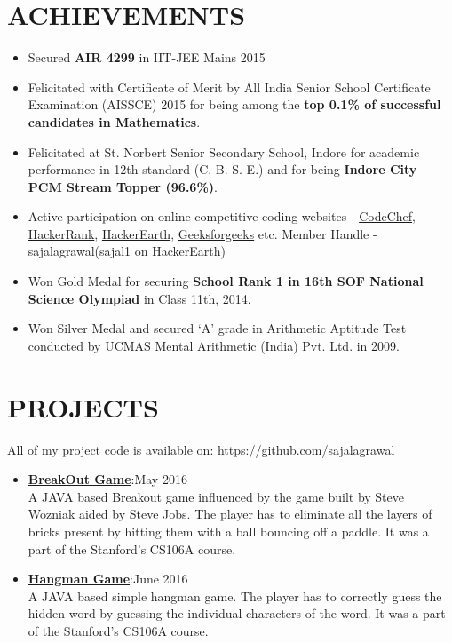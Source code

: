\documentclass[line, margin]{res}
\begin{document}
\begin{resume}
\section{ACHIEVEMENTS}
\begin{itemize}
\item Secured \textbf{AIR 4299} in IIT-JEE Mains 2015
\item Felicitated with Certificate of Merit by All India Senior School Certificate Examination (AISSCE) 2015 for being among the \textbf{top 0.1\% of successful candidates in Mathematics}.
\item Felicitated at St. Norbert Senior Secondary School, Indore for academic performance in 12th standard (C. B. S. E.) and for being \textbf{Indore City PCM Stream Topper (96.6\%)}.
\item Active participation on online competitive coding websites - \href{https://www.codechef.com/users/sajalagrawal}{CodeChef}, \href{https://www.hackerrank.com/sajalagrawal}{HackerRank}, \href{https://www.hackerearth.com/@sajal1}{HackerEarth}, \href{http://www.practice.geeksforgeeks.org/user-profile.php?user=sajalagrawal}{Geeksforgeeks} etc.
Member Handle - sajalagrawal(sajal1 on HackerEarth)
\item Won Gold Medal for securing \textbf{School Rank 1 in 16th SOF National Science Olympiad} in Class 11th, 2014.
\item Won Silver Medal and secured ‘A’ grade in Arithmetic Aptitude Test conducted by UCMAS Mental Arithmetic (India) Pvt. Ltd. in 2009.
\end{itemize}

\section{PROJECTS}
All of my project code is available on: \href{https://github.com/sajalagrawal}{https://github.com/sajalagrawal}
\begin{itemize}
\item\textbf{\href{https://github.com/sajalagrawal/Breakout-Game}{BreakOut Game}}:\hfill May 2016\\ A JAVA based Breakout game influenced by the game built by Steve Wozniak aided by Steve Jobs. The player has to eliminate all the layers of bricks present by hitting them with a ball bouncing off a paddle. It was a part of the Stanford's CS106A course.
\item\textbf{\href{https://github.com/sajalagrawal/Hangman-Game}{Hangman Game}}:\hfill June 2016\\ A JAVA based simple hangman game. The player has to correctly guess the hidden word by guessing the individual characters of the word. It was a part of the Stanford's CS106A course.
\end{itemize}


\end{resume}
\end{document}
